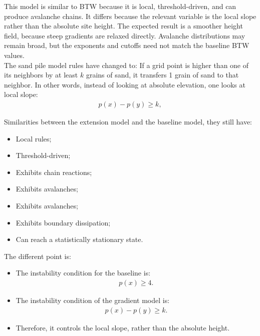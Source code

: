 \documentclass{article}
\begin{document}
This model is similar to BTW because it is local, threshold-driven, and can produce avalanche chains. It differs because the relevant variable is the local slope rather than the absolute site height. The expected result is a smoother height field, because steep gradients are relaxed directly. Avalanche distributions may remain broad, but the exponents and cutoffs need not match the baseline BTW values. \\

The sand pile model rules have changed to: If a grid point is higher than one of its neighbors by at least $k$ grains of sand, it transfers 1 grain of sand to that neighbor. In other words, instead of looking at absolute elevation, one looks at local slope:
\begin{align}
p(x) - p(y) \ge k,
\end{align}

Similarities between the extension model and the baseline model, they still have:

\begin{itemize}
    \item Local rules;
    \item Threshold-driven;
    \item Exhibits chain reactions;
    \item Exhibits avalanches;
    \item Exhibits avalanches;
    \item Exhibits boundary dissipation;
    \item Can reach a statistically stationary state.
\end{itemize}

The different point is:

\begin{itemize}
    \item The instability condition for the baseline is:
    \begin{align}
        p(x) \ge 4.
    \end{align}

    \item The instability condition of the gradient model is:
    \begin{align}
        p(x) - p(y) \ge k.
    \end{align}

    \item Therefore, it controls the local slope, rather than the absolute height.
\end{itemize}
\end{document}

